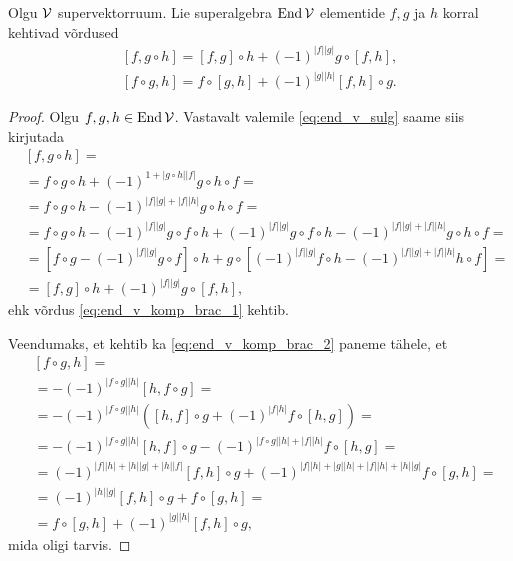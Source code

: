 \begin{lau}
    Olgu $\mathcal{V}$ supervektorruum. Lie superalgebra $\operatorname{End} \mathcal{V}$ elementide
    $f, g$ ja $h$ korral kehtivad võrdused
    \begin{align}
        \label{eq:end_v_komp_brac_1}
        [f, g \circ h] =
            [f, g] \circ h + (-1)^{|f||g|} g \circ [f, h], \\
        \label{eq:end_v_komp_brac_2}
        [f \circ g, h] =
            f \circ [g, h]+ (-1)^{|g||h|} [f, h] \circ g.
    \end{align}
\end{lau}

\begin{proof}
    Olgu $f, g, h \in \operatorname{End} \mathcal{V}$. Vastavalt valemile \eqref{eq:end_v_sulg}
    saame siis kirjutada
    \begin{align*}
        &[f, g \circ h] = \\
        &= f \circ g \circ h +
            (-1)^{1+|g \circ h| |f|} g \circ h \circ f = \\
        &= f \circ g \circ h -
            (-1)^{|f||g| + |f||h|} g \circ h \circ f = \\
        &= f \circ g \circ h - (-1)^{|f||g|} g \circ f \circ h +
            (-1)^{|f||g|} g \circ f \circ h -
            (-1)^{|f||g| + |f||h|} g \circ h \circ f = \\
        &= \left[ f \circ g - (-1)^{|f||g|} g \circ f \right] \circ h +
            g \circ \left[ (-1)^{|f||g|} f \circ h -
            (-1)^{|f||g| + |f||h|} h \circ f \right] = \\
        &= [f, g] \circ h + (-1)^{|f||g|} g \circ [f, h],
    \end{align*}
    ehk võrdus \eqref{eq:end_v_komp_brac_1} kehtib.

    Veendumaks, et kehtib ka \eqref{eq:end_v_komp_brac_2} paneme
    tähele, et
    \begin{align*}
        &[f \circ g, h] = \\
        &= -(-1)^{|f \circ g||h|} [h, f \circ g] = \\
        &= -(-1)^{|f \circ g||h|} \left(
            [h, f] \circ g + (-1)^{|f|h|} f \circ [h, g] \right) = \\
        &= -(-1)^{|f \circ g||h|} [h, f] \circ g -
            (-1)^{|f \circ g||h|+|f||h|} f \circ [h, g] = \\
        &= (-1)^{|f||h|+|h||g|+|h||f|} [f, h] \circ g +
            (-1)^{|f||h|+|g||h|+|f||h|+|h||g|} f \circ [g, h] = \\
        &= (-1)^{|h||g|} [f, h] \circ g + f \circ [g, h] = \\
        &= f \circ [g, h] + (-1)^{|g||h|} [f, h] \circ g,
    \end{align*}
    mida oligi tarvis.
\end{proof}

